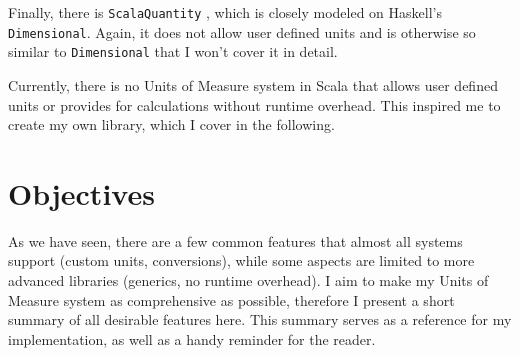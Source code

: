 \documentclass[12pt,oneside,a4paper]{scrbook}
\theoremstyle{definition}
\begin{document}
Finally, there is \verb/ScalaQuantity/ \citep{Hans12}, which is closely modeled on Haskell's \verb/Dimensional/. Again, it does not allow user defined units and is otherwise so similar to \verb/Dimensional/ that I won't cover it in detail.

Currently, there is no Units of Measure system in Scala that allows user defined units or provides for calculations without runtime overhead. This inspired me to create my own library, which I cover in the following.

\chapter{Objectives}

As we have seen, there are a few common features that almost all systems support (custom units, conversions), while some aspects are limited to more advanced libraries (generics, no runtime overhead). I aim to make my Units of Measure system as comprehensive as possible, therefore I present a short summary of all desirable features here. This summary serves as a reference for my implementation, as well as a handy reminder for the reader.
\end{document}
